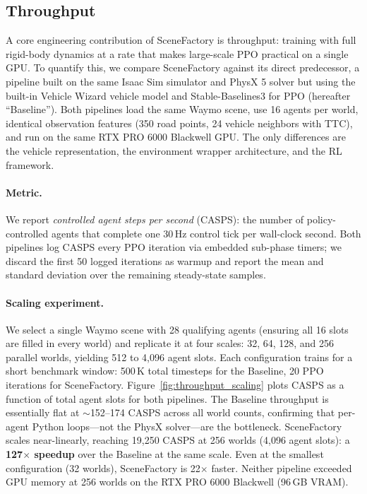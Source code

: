 \subsection{Throughput}
\label{sec:throughput}

A core engineering contribution of SceneFactory is throughput: training with full rigid-body dynamics at a rate that makes large-scale PPO practical on a single GPU.
To quantify this, we compare SceneFactory against its direct predecessor, a pipeline built on the same Isaac Sim simulator and PhysX 5 solver but using the built-in Vehicle Wizard vehicle model and Stable-Baselines3 for PPO (hereafter ``Baseline'').
Both pipelines load the same Waymo scene, use 16 agents per world, identical observation features (350 road points, 24 vehicle neighbors with TTC), and run on the same RTX PRO 6000 Blackwell GPU.
The only differences are the vehicle representation, the environment wrapper architecture, and the RL framework.

\paragraph{Metric.}
We report \emph{controlled agent steps per second} (CASPS): the number of policy-controlled agents that complete one 30\,Hz control tick per wall-clock second.
Both pipelines log CASPS every PPO iteration via embedded sub-phase timers;
we discard the first 50 logged iterations as warmup and report the mean and standard deviation over the remaining steady-state samples.

\paragraph{Scaling experiment.}
We select a single Waymo scene with 28 qualifying agents (ensuring all 16 slots are filled in every world) and replicate it at four scales: 32, 64, 128, and 256 parallel worlds, yielding 512 to 4{,}096 agent slots.
Each configuration trains for a short benchmark window: 500\,K total timesteps for the Baseline, 20 PPO iterations for SceneFactory.
Figure~\ref{fig:throughput_scaling} plots CASPS as a function of total agent slots for both pipelines.
The Baseline throughput is essentially flat at $\sim$152--174 CASPS across all world counts, confirming that per-agent Python loops---not the PhysX solver---are the bottleneck.
SceneFactory scales near-linearly, reaching 19{,}250 CASPS at 256 worlds (4{,}096 agent slots): a \textbf{127$\times$ speedup} over the Baseline at the same scale.
Even at the smallest configuration (32 worlds), SceneFactory is 22$\times$ faster.
Neither pipeline exceeded GPU memory at 256 worlds on the RTX PRO 6000 Blackwell (96\,GB VRAM).

